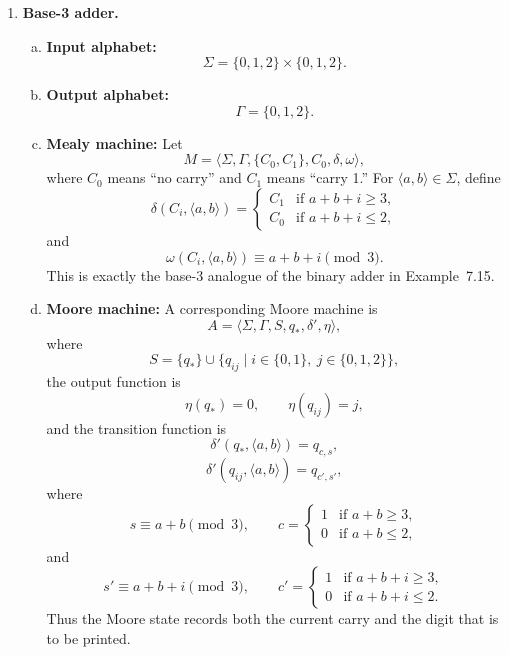 \begin{enumerate}[{7.}1.]
\item \textbf{Base-3 adder.}

\begin{enumerate}[(a)]
  \item \textbf{Input alphabet:}
  \[
    \Sigma=\{0,1,2\}\times\{0,1,2\}.
  \]

  \item \textbf{Output alphabet:}
  \[
    \Gamma=\{0,1,2\}.
  \]

  \item \textbf{Mealy machine:}  Let
  \[
    M=\langle \Sigma,\Gamma,\{C_0,C_1\},C_0,\delta,\omega\rangle,
  \]
  where $C_0$ means ``no carry'' and $C_1$ means ``carry 1.''  For
  $\langle a,b\rangle\in\Sigma$, define
  \[
    \delta(C_i,\langle a,b\rangle)=
    \begin{cases}
      C_1 & \text{if }a+b+i\ge 3,\\
      C_0 & \text{if }a+b+i\le 2,
    \end{cases}
  \]
  and
  \[
    \omega(C_i,\langle a,b\rangle)\equiv a+b+i \pmod 3.
  \]
  This is exactly the base-3 analogue of the binary adder in Example~7.15.

  \item \textbf{Moore machine:}  A corresponding Moore machine is
  \[
    A=\langle \Sigma,\Gamma,S,q_*,\delta',\eta\rangle,
  \]
  where
  \[
    S=\{q_*\}\cup\{q_{ij}\mid i\in\{0,1\},\ j\in\{0,1,2\}\},
  \]
  the output function is
  \[
    \eta(q_*)=0,\qquad \eta(q_{ij})=j,
  \]
  and the transition function is
  \[
    \delta'(q_*,\langle a,b\rangle)=q_{c,s},
  \]
  \[
    \delta'(q_{ij},\langle a,b\rangle)=q_{c',s'},
  \]
  where
  \[
    s\equiv a+b \pmod 3,\qquad
    c=
    \begin{cases}
      1 & \text{if }a+b\ge 3,\\
      0 & \text{if }a+b\le 2,
    \end{cases}
  \]
  and
  \[
    s'\equiv a+b+i \pmod 3,\qquad
    c'=
    \begin{cases}
      1 & \text{if }a+b+i\ge 3,\\
      0 & \text{if }a+b+i\le 2.
    \end{cases}
  \]
  Thus the Moore state records both the current carry and the digit that is to
  be printed.


\end{enumerate}
\end{enumerate}
